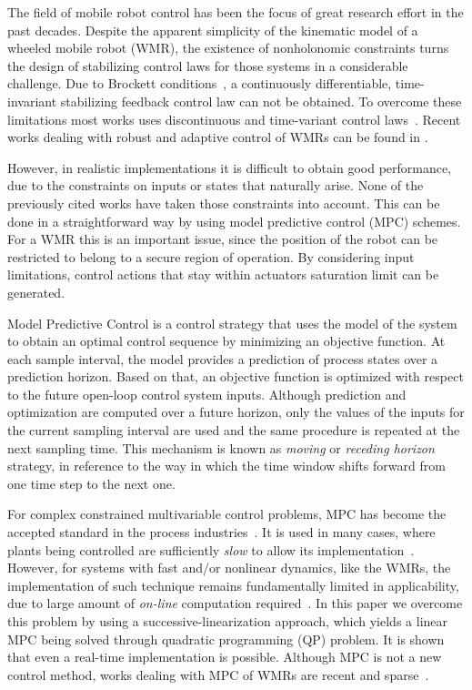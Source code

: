 \documentclass[conference]{IEEEtran} %
\begin{document}
The field of mobile robot control has been the focus of great research
effort in the past decades. Despite the apparent simplicity of the kinematic
model of a wheeled mobile robot (WMR), the existence of nonholonomic
constraints turns the design of stabilizing control laws for those systems
in a considerable challenge. Due to Brockett conditions~\cite{brockett82}, a
continuously differentiable, time-invariant stabilizing feedback control law
can not be obtained. To overcome these limitations most works uses
discontinuous and time-variant control
laws~\cite{bloch89,samson91,canudas92,yamamoto94,murray97}. Recent works
dealing with robust and adaptive control of WMRs can be found in
\cite{oya03,dixon04}.

However, in realistic implementations it is difficult to obtain good
performance, due to the constraints on inputs or states that naturally
arise. None of the previously cited works have taken those constraints
into account. This can be done in a straightforward way by using model
predictive control (MPC) schemes. For a WMR this is an important issue,
since the position of the robot can be restricted to belong to a secure
region of operation. By considering input limitations, control actions that
stay within actuators saturation limit can be generated.

Model Predictive Control is a control strategy that uses the model of the
system to obtain an optimal control sequence by minimizing an objective
function. At each sample interval, the model provides a prediction of
process states over a prediction horizon. Based on that, an objective
function is optimized with respect to the future open-loop control system
inputs. Although prediction and optimization are computed over a future
horizon, only the values of the inputs for the current sampling interval are
used and the same procedure is repeated at the next sampling time. This
mechanism is known as {\it moving} or {\it receding horizon} strategy, in
reference to the way in which the time window shifts forward from one time
step to the next one.

For complex constrained multivariable control problems, MPC has become the
accepted standard in the process industries~\cite{bemporad02}. It is used in
many cases, where plants being controlled are sufficiently {\em slow} to
allow its implementation~\cite{mayne98}. However, for systems with fast
and/or nonlinear dynamics, like the WMRs, the implementation of such
technique remains fundamentally limited in applicability, due to large
amount of {\em on-line} computation required~\cite{cannon00}. In this paper
we overcome this problem by using a successive-linearization approach, which
yields a linear MPC being solved through quadratic programming (QP)
problem. It is shown that even a real-time implementation is possible.
Although MPC is not a new control method, works dealing with MPC of WMRs are
recent and sparse~\cite{ollero91,rico99,essen01}.
\end{document}
